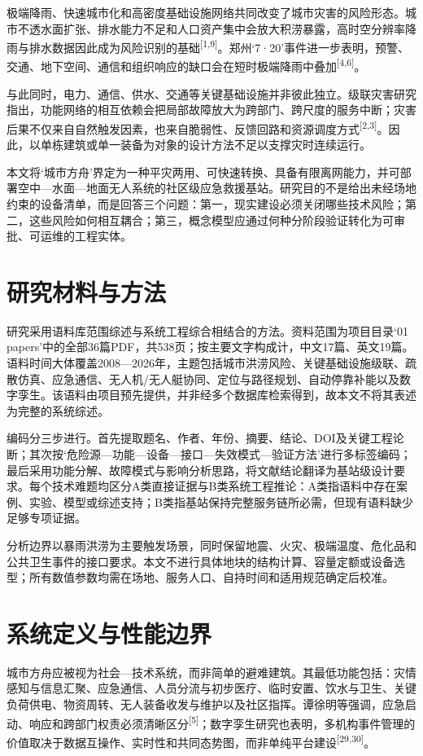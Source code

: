 \documentclass[UTF8,a4paper,zihao=-4]{ctexart}
\begin{document}
极端降雨、快速城市化和高密度基础设施网络共同改变了城市灾害的风险形态。城市不透水面扩张、排水能力不足和人口资产集中会放大积涝暴露，高时空分辨率降雨与排水数据因此成为风险识别的基础\textsuperscript{[1,9]}。郑州‘7·20’事件进一步表明，预警、交通、地下空间、通信和组织响应的缺口会在短时极端降雨中叠加\textsuperscript{[4,6]}。

与此同时，电力、通信、供水、交通等关键基础设施并非彼此独立。级联灾害研究指出，功能网络的相互依赖会把局部故障放大为跨部门、跨尺度的服务中断；灾害后果不仅来自自然触发因素，也来自脆弱性、反馈回路和资源调度方式\textsuperscript{[2,3]}。因此，以单栋建筑或单一装备为对象的设计方法不足以支撑灾时连续运行。

本文将‘城市方舟’界定为一种平灾两用、可快速转换、具备有限离网能力，并可部署空中—水面—地面无人系统的社区级应急救援基站。研究目的不是给出未经场地约束的设备清单，而是回答三个问题：第一，现实建设必须关闭哪些技术风险；第二，这些风险如何相互耦合；第三，概念模型应通过何种分阶段验证转化为可审批、可运维的工程实体。

\section{研究材料与方法}

研究采用语料库范围综述与系统工程综合相结合的方法。资料范围为项目目录‘01 papers’中的全部36篇PDF，共538页；按主要文字构成计，中文17篇、英文19篇。语料时间大体覆盖2008—2026年，主题包括城市洪涝风险、关键基础设施级联、疏散仿真、应急通信、无人机/无人艇协同、定位与路径规划、自动停靠补能以及数字孪生。该语料由项目预先提供，并非经多个数据库检索得到，故本文不将其表述为完整的系统综述。

编码分三步进行。首先提取题名、作者、年份、摘要、结论、DOI及关键工程论断；其次按‘危险源—功能—设备—接口—失效模式—验证方法’进行多标签编码；最后采用功能分解、故障模式与影响分析思路，将文献结论翻译为基站级设计要求。每个技术难题均区分A类直接证据与B类系统工程推论：A类指语料中存在案例、实验、模型或综述支持；B类指基站保持完整服务链所必需，但现有语料缺少足够专项证据。

分析边界以暴雨洪涝为主要触发场景，同时保留地震、火灾、极端温度、危化品和公共卫生事件的接口要求。本文不进行具体地块的结构计算、容量定额或设备选型；所有数值参数均需在场地、服务人口、自持时间和适用规范确定后校准。

\section{系统定义与性能边界}

城市方舟应被视为社会—技术系统，而非简单的避难建筑。其最低功能包括：灾情感知与信息汇聚、应急通信、人员分流与初步医疗、临时安置、饮水与卫生、关键负荷供电、物资周转、无人装备收发与维护以及社区指挥。谭徐明等强调，应急启动、响应和跨部门权责必须清晰区分\textsuperscript{[5]}；数字孪生研究也表明，多机构事件管理的价值取决于数据互操作、实时性和共同态势图，而非单纯平台建设\textsuperscript{[29,30]}。
\end{document}
